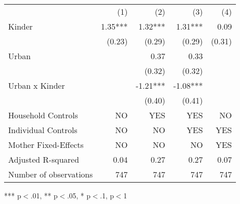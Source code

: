 \begin{tabular}{lllll}
\cline{1-5}
\multicolumn{1}{c}{} &
  \multicolumn{1}{r}{(1)} &
  \multicolumn{1}{r}{(2)} &
  \multicolumn{1}{r}{(3)} &
  \multicolumn{1}{r}{(4)} \\
\cline{1-5}
\multicolumn{1}{l}{Kinder} &
  \multicolumn{1}{r}{1.35***} &
  \multicolumn{1}{r}{1.32***} &
  \multicolumn{1}{r}{1.31***} &
  \multicolumn{1}{r}{0.09 } \\
\multicolumn{1}{l}{} &
  \multicolumn{1}{r}{(0.23)} &
  \multicolumn{1}{r}{(0.29)} &
  \multicolumn{1}{r}{(0.29)} &
  \multicolumn{1}{r}{(0.31)} \\
\multicolumn{1}{l}{Urban} &
  \multicolumn{1}{r}{} &
  \multicolumn{1}{r}{0.37 } &
  \multicolumn{1}{r}{0.33 } &
  \multicolumn{1}{r}{} \\
\multicolumn{1}{l}{} &
  \multicolumn{1}{r}{} &
  \multicolumn{1}{r}{(0.32)} &
  \multicolumn{1}{r}{(0.32)} &
  \multicolumn{1}{r}{} \\
\multicolumn{1}{l}{Urban x Kinder} &
  \multicolumn{1}{r}{} &
  \multicolumn{1}{r}{-1.21***} &
  \multicolumn{1}{r}{-1.08***} &
  \multicolumn{1}{r}{} \\
\multicolumn{1}{l}{} &
  \multicolumn{1}{r}{} &
  \multicolumn{1}{r}{(0.40)} &
  \multicolumn{1}{r}{(0.41)} &
  \multicolumn{1}{r}{} \\
\multicolumn{1}{l}{Household Controls} &
  \multicolumn{1}{r}{NO} &
  \multicolumn{1}{r}{YES} &
  \multicolumn{1}{r}{YES} &
  \multicolumn{1}{r}{NO} \\
\multicolumn{1}{l}{Individual Controls} &
  \multicolumn{1}{r}{NO} &
  \multicolumn{1}{r}{NO} &
  \multicolumn{1}{r}{YES} &
  \multicolumn{1}{r}{YES} \\
\multicolumn{1}{l}{Mother Fixed-Effects} &
  \multicolumn{1}{r}{NO} &
  \multicolumn{1}{r}{NO} &
  \multicolumn{1}{r}{NO} &
  \multicolumn{1}{r}{YES} \\
\multicolumn{1}{l}{Adjusted R-squared} &
  \multicolumn{1}{r}{0.04} &
  \multicolumn{1}{r}{0.27} &
  \multicolumn{1}{r}{0.27} &
  \multicolumn{1}{r}{0.07} \\
\multicolumn{1}{l}{Number of observations} &
  \multicolumn{1}{r}{747} &
  \multicolumn{1}{r}{747} &
  \multicolumn{1}{r}{747} &
  \multicolumn{1}{r}{747} \\
\cline{1-5}
\end{tabular}

\footnotesize{
*** p$<$.01, ** p$<$.05, * p$<$.1,  p$<$1
}
